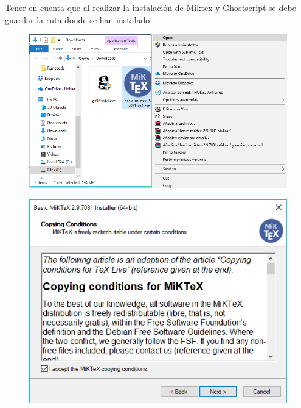 \documentclass{article}
\begin{document}
Tener en cuenta que al realizar la instalación de Miktex y Ghostscript se debe
guardar la ruta donde se han instalado.

\begin{figure}[h!]
  \centering
  \includegraphics[scale=0.75]{./imagenes/Install_Miktex2.png}
\end{figure}

\begin{figure}[h!]
  \centering
  \includegraphics[scale=0.75]{./imagenes/Install_Miktex3.png}
\end{figure}
\end{document}
